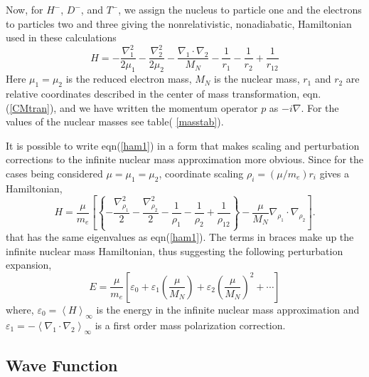 \documentclass[12pt,thmsa]{article}
\begin{document}
Now, for $H^{-}$, $D^{-}$, and $T^{-}$, we assign the nucleus to particle
one and the electrons to particles two and three giving the nonrelativistic,
nonadiabatic, Hamiltonian used in these calculations 
\begin{equation}
H=-\frac{\nabla _1^2}{2\mu _1}-\frac{\nabla _2^2}{2\mu _2}-\frac{\nabla
_1\cdot \nabla _2}{M_N}-\frac 1{r_1}-\frac 1{r_2}+\frac 1{r_{12}}
\label{ham1}
\end{equation}
Here $\mu _1=\mu _2$ is the reduced electron mass, $M_N$ is the nuclear
mass, $r_1$ and $r_2$ are relative coordinates described in the center of
mass transformation, eqn.(\ref{CMtran}), and we have written the momentum
operator $p$ as $-i\nabla $. For the values of the nuclear masses see table(%
\ref{masstab}).

It is possible to write eqn(\ref{ham1}) in a form that makes scaling and
perturbation corrections to the infinite nuclear mass approximation more
obvious\cite{Drake96}. Since for the cases being considered $\mu =\mu _1=\mu
_2$, coordinate scaling $\rho _i=\left( \mu /m_e\right) r_i$ gives a
Hamiltonian, 
\begin{equation}
H=\frac \mu {m_e}\left[ \left\{ -\frac{\nabla _{\rho _1}^2}2-\frac{\nabla
_{\rho _2}^2}2-\frac 1{\rho _1}-\frac 1{\rho _2}+\frac 1{\rho _{12}}\right\}
-\frac \mu {M_N}\nabla _{\rho _1}\cdot \nabla _{\rho _2}\right] .
\label{ham2}
\end{equation}
that has the same eigenvalues as eqn(\ref{ham1}). The terms in braces make
up the infinite nuclear mass Hamiltonian, thus suggesting the following
perturbation expansion, 
\begin{equation}
E=\frac \mu {m_e}\left[ \varepsilon _0+\varepsilon _1\left( \frac \mu
{M_N}\right) +\varepsilon _2\left( \frac \mu {M_N}\right) ^2+\cdots \right]
\label{Epert}
\end{equation}
where, $\varepsilon _0=\left\langle H\right\rangle _\infty $ is the energy
in the infinite nuclear mass approximation and $\varepsilon _1=-\left\langle
\nabla _1\cdot \nabla _2\right\rangle _\infty $ is a first order mass
polarization correction.

\subsection{Wave Function}
\end{document}
